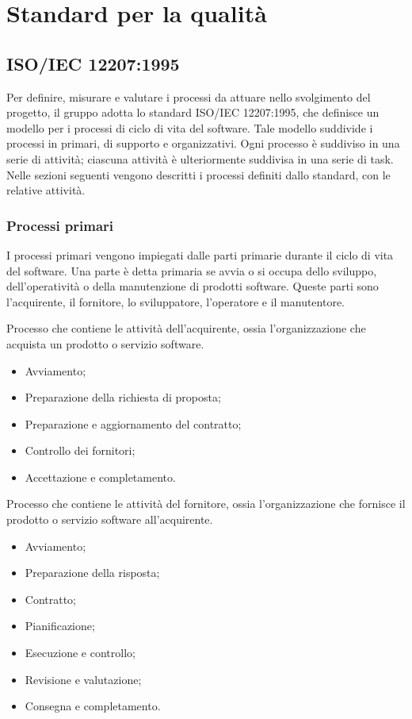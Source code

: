 \section{Standard per la qualità}

\subsection{ISO/IEC 12207:1995}
Per definire, misurare e valutare i processi da attuare nello svolgimento
del progetto, il gruppo adotta lo standard ISO/IEC 12207:1995, che
definisce un modello per i processi di ciclo di vita del software. 
Tale modello suddivide i processi in primari, di supporto e organizzativi.
Ogni processo è suddiviso in una serie di attività; ciascuna attività è 
ulteriormente suddivisa in una serie di task.
Nelle sezioni seguenti vengono descritti i processi definiti dallo standard, 
con le relative attività.

\subsubsection{Processi primari}
I processi primari vengono impiegati dalle parti primarie durante il ciclo di 
vita del software. Una parte è detta primaria se avvia o si occupa dello 
sviluppo, dell'operatività o della manutenzione di prodotti software. 
Queste parti sono l'acquirente, il fornitore, lo sviluppatore, l'operatore e il manutentore.

Processo che contiene le attività dell'acquirente, ossia l'organizzazione che
acquista un prodotto o servizio software.
\begin{itemize}
    \item Avviamento;
    \item Preparazione della richiesta di proposta;
    \item Preparazione e aggiornamento del contratto;
    \item Controllo dei fornitori;
    \item Accettazione e completamento.
\end{itemize}

Processo che contiene le attività del fornitore, ossia l'organizzazione che
fornisce il prodotto o servizio software all'acquirente.
\begin{itemize}
    \item Avviamento;
    \item Preparazione della risposta;
    \item Contratto;
    \item Pianificazione;
    \item Esecuzione e controllo;
    \item Revisione e valutazione;
    \item Consegna e completamento.
\end{itemize}

